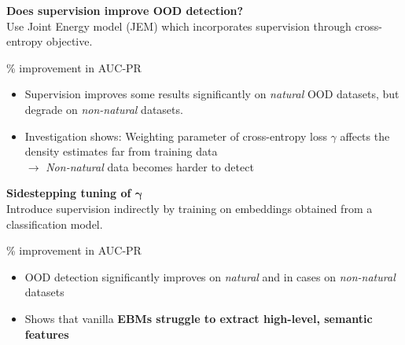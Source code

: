 \documentclass[landscape,a0paper,fontscale=0.30]{baposter}
\begin{document}
\begin{poster}
{\begin{minipage}[t]{0.48\linewidth}
    \vspace{1em}

    \textbf{\color{blue}Does supervision improve OOD detection?}\\
    Use Joint Energy model (JEM) which incorporates supervision through cross-entropy objective.
    \begin{center}
        \resizebox{.45\textwidth}{!}{
            
        }
        \vspace{0.5em}

        {\small \% improvement in AUC-PR}
    \end{center}
    \begin{itemize}
        \item Supervision improves some results significantly on \textit{natural} OOD datasets, but degrade on \textit{non-natural} datasets. 
        \item Investigation shows: Weighting parameter of cross-entropy loss \(\gamma \) affects the density estimates far from training data \\
        \(\rightarrow \) \textit{Non-natural} data becomes harder to detect
    \end{itemize}
    \begin{center}
    \end{center}
    \end{minipage}%
    \hfill
    \begin{minipage}[t]{.48\linewidth}
        \textbf{\small \color{blue}Sidestepping tuning of \(\boldsymbol{\gamma} \)}\\
        Introduce supervision indirectly by training on embeddings obtained from a classification model.
        \begin{center}
        \resizebox{0.5\textwidth}{!}{
        
        }
        \vspace{0.5em}

        \% improvement in AUC-PR
        \end{center}
        \begin{itemize}
            \item OOD detection significantly improves on \textit{natural} and in cases on \textit{non-natural} datasets
            \item Shows that vanilla \textbf{EBMs struggle to extract high-level, semantic features}
        \end{itemize}


\end{minipage}}
\end{poster}
\end{document}

